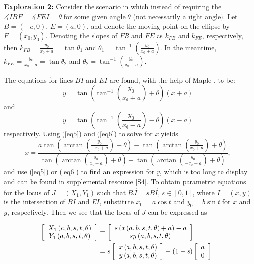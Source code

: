 \documentclass[12pt,a4paper]{article}%
\begin{document}
\textbf{Exploration 2:}
Consider the scenario in which instead of requiring the
$\measuredangle IBF=\measuredangle FEI=\theta$ for some given angle $\theta$
(not necessarily a right angle).
Let $B=(-a,0)$, $E=(a,0)$, and denote the moving point on the ellipse
by $F=(x_{0},y_{0})$. Denoting the slopes of $FB$ and $FE$
as $k_{FB}$ and $k_{FE}$, respectively, then
$k_{FB}=\frac{y_{0}}{x_{0}+a}=\tan\theta_{1}$
and
$\theta_{1}=\tan^{-1}\left(  \frac{y_{0}}{x_{0}+a}\right)$.
In the meantime, $k_{FE}=\frac{y_{0}}{x_{0}-a}=\tan\theta_{2}$
and $\theta_{2}=\tan^{-1}\left(  \frac{y_{0}}{x_{0}-a}\right)$.

The equations for lines $BI$ and $EI$ are found,
with the help of Maple \cite{Maple}, to be:
\begin{equation}
y=\tan\left(  \tan^{-1}\left(  \frac{y_{0}}{x_{0}+a}\right)  +\theta\right)
\left(  x+a\right) \label{eq5}
\end{equation}
and
\begin{equation}
y=\tan\left(  \tan^{-1}\left(  \frac{y_{0}}{x_{0}-a}\right)  -\theta\right)
\left(  x-a\right) \label{eq6}%
\end{equation}
respectively.
Using (\ref{eq5}) and (\ref{eq6}) to solve for $x$ yields
\[
x=\frac{a\tan\left(  \arctan\left(  \frac{y_{0}}{-x_{0}+a}\right)
+\theta\right)  -\tan\left(  \arctan\left(  \frac{y_{0}}{x_{0}+a}\right)
+\theta\right)  }{\tan\left(  \arctan\left(  \frac{y_{0}}{x_{0}+a}\right)
+\theta\right)  +\tan\left(  \arctan\left(  \frac{y_{0}}{-x_{0}+a}\right)
+\theta\right)  },
\]
and use (\ref{eq5}) or (\ref{eq6}) to find an expression for $y$,
which is too long to display and can be found in supplemental resource [S4].
To obtain parametric equations for the locus of $J=(X_1,Y_1)$ such that
$\overrightarrow{BJ} = s \overrightarrow{BI}$, $s\in[0,1]$,
where $I=(x,y)$ is the intersection of $BI$ and $EI$, substitute
$x_{0}=a\cos t$ and
$y_{0}=b\sin t$ for $x$ and $y$, respectively.
Then we see that the locus of $J$ can be expressed as

\begin{align*}
\left[
\begin{array}
[c]{c}%
X_{1}\left(  a,b,s,t,\theta\right) \\
Y_{1}\left(  a,b,s,t,\theta\right)
\end{array}
\right]
 & = \left[
\begin{array}
[c]{c}%
s\left(  x\left(  a,b,s,t,\theta\right)  +a\right)  -a\\
sy\left(  a,b,s,t,\theta\right)
\end{array}
\right] \\ 
 & = s\left[
\begin{array}
[c]{c}%
x\left(  a,b,s,t,\theta\right) \\
y\left(  a,b,s,t,\theta\right)
\end{array}
\right]  -\left(  1-s\right)  \left[
\begin{array}
[c]{c}%
a\\
0
\end{array}
\right]  .
\end{align*}
\end{document}

